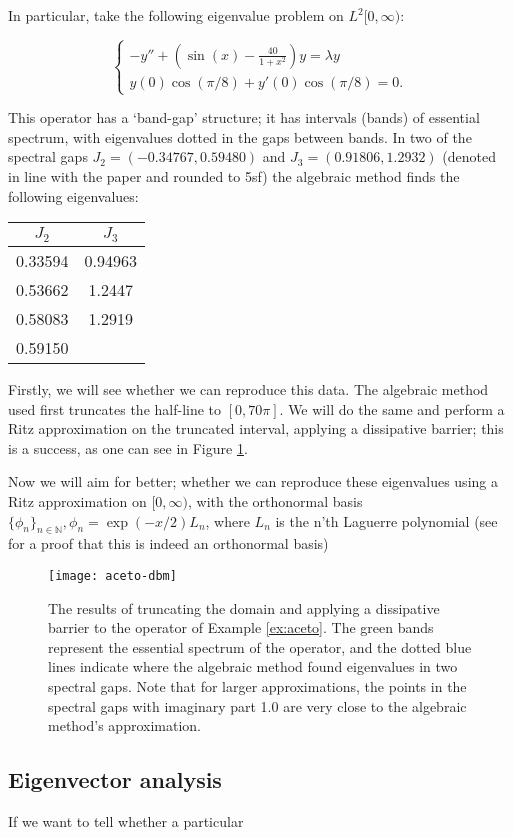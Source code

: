 \documentclass[../main.tex]{subfiles}
\begin{document}
\begin{example}\label{ex:aceto}
In particular, take the following eigenvalue problem on $L^2[0, \infty)$:

$$
\begin{cases}
-y'' + (\sin(x) - \frac{40}{1+x^2})y = \lambda y \\
y(0) \cos(\pi/8) + y'(0) \cos(\pi/8) = 0.
\end{cases}
$$

This operator has a `band-gap' structure; it has intervals (bands) of essential spectrum, with eigenvalues dotted in the gaps between bands.
In two of the spectral gaps $J_2 = (-0.34767, 0.59480)$ and $J_3 = (0.91806, 1.2932)$ (denoted in line with the paper and rounded to 5sf) the
algebraic method finds the following eigenvalues:

\begin{figure*}[h!]
\centering
\begin{tabular}{c c}
$J_2$ & $J_3$ \\
\hline\hline
0.33594 & 0.94963 \\
0.53662 & 1.2447 \\
0.58083 & 1.2919 \\
0.59150 & \\
\end{tabular}
\end{figure*}

Firstly, we will see whether we can reproduce this data. The algebraic method used first truncates the half-line to $[0, 70\pi]$. We will do the same and
perform a Ritz approximation on the truncated interval, applying a dissipative barrier; this is a success, as one can see in Figure \ref{fig:aceto-dbm}.

Now we will aim for better; whether we can reproduce these eigenvalues using a Ritz approximation on $[0, \infty)$, with the orthonormal basis $\{\phi_n\}_{n \in \mathbb{N}},
\phi_n = \exp(-x/2)L_n$, where $L_n$ is the n'th Laguerre polynomial (see \cite{szego1975orthogonal} for a proof that this is indeed an orthonormal basis)
\end{example}

\begin{figure}[p!]
\texttt{[image: aceto-dbm]}
\caption{The results of truncating the domain and applying a dissipative barrier to the operator of Example \ref{ex:aceto}.
The green bands represent the essential spectrum of the operator, and the dotted blue lines indicate where the algebraic method found
eigenvalues in two spectral gaps. Note that for larger approximations, the points in the spectral gaps with imaginary part 1.0 are
very close to the algebraic method's approximation.}
\label{fig:aceto-dbm}
\end{figure}

\subsection{Eigenvector analysis}
If we want to tell whether a particular 
\end{document}
